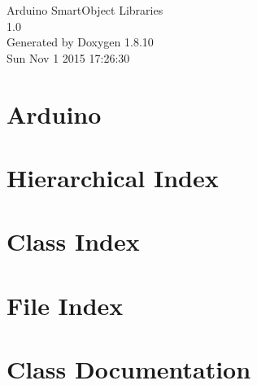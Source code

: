 \documentclass[twoside]{book}
\newcommand{\+}{\discretionary{\mbox{\scriptsize$\hookleftarrow$}}{}{}}
\newcommand{\clearemptydoublepage}{%
  \newpage{\pagestyle{empty}\cleardoublepage}%
}
\begin{document}
\hypersetup{pageanchor=false,
             bookmarks=true,
             bookmarksnumbered=true,
             pdfencoding=unicode
            }
\begin{titlepage}
\vspace*{7cm}
\begin{center}%
{\Large Arduino Smart\+Object Libraries \\[1ex]\large 1.\+0 }\\
\vspace*{1cm}
{\large Generated by Doxygen 1.8.10}\\
\vspace*{0.5cm}
{\small Sun Nov 1 2015 17:26:30}\\
\end{center}
\end{titlepage}
\clearemptydoublepage
\tableofcontents
\clearemptydoublepage
{}
\hypersetup{pageanchor=true}

\chapter{Arduino}
\label{md__r_e_a_d_m_e}
\hypertarget{md__r_e_a_d_m_e}{}

\chapter{Hierarchical Index}

\chapter{Class Index}

\chapter{File Index}

\chapter{Class Documentation}

























\end{document}
